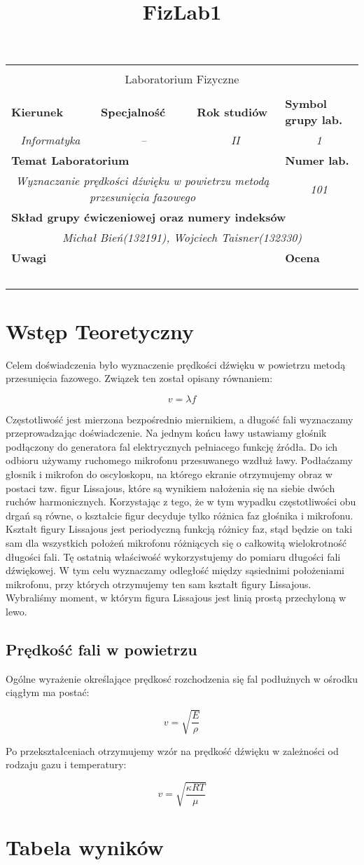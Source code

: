 \documentclass[polish,a4paper]{article}
\title{FizLab1}
\newcommand{\PRzFieldDsc}[1]{\sffamily\bfseries\scriptsize #1}
\newcommand{\PRzFieldCnt}[1]{\textit{#1}}
\newcommand{\PRzHeading}[8]{
\begin{center}
\begin{tabular}{ p{0.32\textwidth} p{0.15\textwidth} p{0.15\textwidth} p{0.12\textwidth} p{0.12\textwidth} }

  &   &   &   &   \\
\hline
\multicolumn{5}{|c|}{}\\[-1ex]
\multicolumn{5}{|c|}{{\LARGE #1}}\\
\multicolumn{5}{|c|}{}\\[-1ex]

\hline
\multicolumn{1}{|l|}{\PRzFieldDsc{Kierunek}}	& \multicolumn{1}{|l|}{\PRzFieldDsc{Specjalność}}	& \multicolumn{1}{|l|}{\PRzFieldDsc{Rok studiów}}	& \multicolumn{2}{|l|}{\PRzFieldDsc{Symbol grupy lab.}} \\
\multicolumn{1}{|c|}{\PRzFieldCnt{#2}}		& \multicolumn{1}{|c|}{\PRzFieldCnt{#3}}		& \multicolumn{1}{|c|}{\PRzFieldCnt{#4}}		& \multicolumn{2}{|c|}{\PRzFieldCnt{#5}} \\

\hline
\multicolumn{4}{|l|}{\PRzFieldDsc{Temat Laboratorium}}		& \multicolumn{1}{|l|}{\PRzFieldDsc{Numer lab.}} \\
\multicolumn{4}{|c|}{\PRzFieldCnt{#6}}				& \multicolumn{1}{|c|}{\PRzFieldCnt{#7}} \\

\hline
\multicolumn{5}{|l|}{\PRzFieldDsc{Skład grupy ćwiczeniowej oraz numery indeksów}}\\
\multicolumn{5}{|c|}{\PRzFieldCnt{#8}}\\

\hline
\multicolumn{3}{|l|}{\PRzFieldDsc{Uwagi}}	& \multicolumn{2}{|l|}{\PRzFieldDsc{Ocena}} \\
\multicolumn{3}{|c|}{\PRzFieldCnt{\ }}		& \multicolumn{2}{|c|}{\PRzFieldCnt{\ }} \\

\hline
\end{tabular}
\end{center}
}
\begin{document}
\PRzHeading{Laboratorium Fizyczne}{Informatyka}{--}{II}{1}{Wyznaczanie prędkości dźwięku w powietrzu
metodą przesunięcia fazowego }{101}{Michał Bień(132191), Wojciech Taisner(132330)}{}

\section{Wstęp Teoretyczny}
Celem doświadczenia było wyznaczenie prędkości dźwięku w powietrzu metodą przesunięcia fazowego. Związek ten został opisany równaniem:

$$ v= \lambda f $$

Częstotliwość jest mierzona bezpośrednio miernikiem, a długość fali wyznaczamy przeprowadzając doświadczenie.
\newline
Na jednym końcu ławy ustawiamy głośnik podłączony do generatora fal elektrycznych pełniacego funkcję źródła. Do ich odbioru używamy ruchomego mikrofonu przesuwanego wzdłuż ławy. Podłaćzamy głosnik i mikrofon do oscyloskopu, na którego ekranie otrzymujemy obraz w postaci tzw. figur Lissajous, które są wynikiem nałożenia się na siebie dwóch ruchów harmonicznych. Korzystając z tego, że w tym wypadku częstotliwości obu drgań są równe, o kształcie figur decyduje tylko różnica faz głośnika i mikrofonu. Kształt figury Lissajous jest periodyczną funkcją różnicy faz, stąd będzie on taki sam dla wszystkich położeń mikrofonu różniących się o całkowitą wielokrotność długości fali.
Tę ostatnią właściwość wykorzystujemy do pomiaru długości fali dźwiękowej. W tym celu wyznaczamy odległość między sąsiednimi położeniami mikrofonu, przy których otrzymujemy ten sam kształt figury Lissajous. Wybraliśmy moment, w którym figura Lissajous jest linią prostą przechyloną w lewo.

\subsection{Prędkość fali w powietrzu}
Ogólne wyrażenie określające prędkosć rozchodzenia się fal podłużnych w ośrodku ciągłym ma postać:

$$ v = \sqrt{\frac{E}{\rho}}$$

Po przekształceniach otrzymujemy wzór na prędkość dźwięku w zależności od rodzaju gazu i temperatury:

$$ v = \sqrt{\frac{\kappa RT}{\mu}}$$

\section{Tabela wyników}
\end{document}
